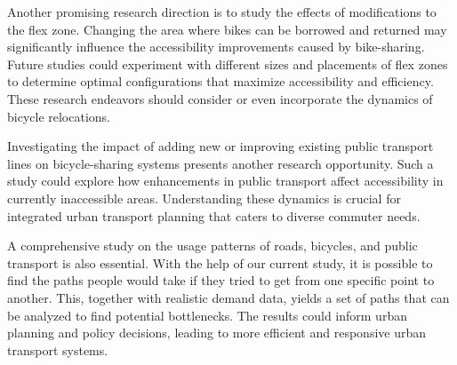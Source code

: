 Another promising research direction is to study the effects of modifications to the flex zone. 
Changing the area where bikes can be borrowed and returned may significantly influence the accessibility improvements caused by bike-sharing. 
Future studies could experiment with different sizes and placements of flex zones to determine optimal configurations that maximize accessibility and efficiency.
These research endeavors should consider or even incorporate the dynamics of bicycle relocations.

Investigating the impact of adding new or improving existing public transport lines on bicycle-sharing systems presents another research opportunity. 
Such a study could explore how enhancements in public transport affect accessibility in currently inaccessible areas.
Understanding these dynamics is crucial for integrated urban transport planning that caters to diverse commuter needs.

A comprehensive study on the usage patterns of roads, bicycles, and public transport is also essential. 
With the help of our current study, it is possible to find the paths people would take if they tried to get from one specific point to another.
This, together with realistic demand data, yields a set of paths that can be analyzed to find potential bottlenecks.
The results could inform urban planning and policy decisions, leading to more efficient and responsive urban transport systems.

